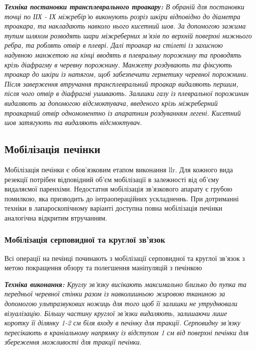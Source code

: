 \begin{refsection}
\textit{ \textbf{Техніка постановки трансплеврального троакару:} В обраній для постановки точці по ІІХ - ІХ  міжребір'ю виконують розріз шкіри відповідно до діаметра троакара, та накладають навколо нього кисетний шов. За допомогою зажима тупим шляхом розводять шари міжреберних м'язів по верхній поверхні нижнього ребра, та роблять отвір в плеврі. Далі троакар на стілеті із захисною надувною манжетою на кінці вводять в плевральну порожнину та проводять крізь діафрагму в черевну порожнину. Манжету роздувають та фіксують троакар до шкіри із натягом, щоб забезпечити герметику черевної порожнини. Після заверження втручання трансплевральний троакар видаляють першим, після чого отвір в діафрагмі ушивають. Залишки газу із плевральної порожинин видаляють за допомогою відсмоктувача, введеного крізь міжреберний троакарний отвір одномоментно із апаратним роздуванням легені. Кисетний шов затягують та видаляють відсмоктувач. }

\subsection{Мобілізація печінки}

Мобілізація печінки є обов'язковим етапом виконання \acrshort{llr}. Для кожного вида резекції потрібен відповідний об'єм мобілізації в залежності від об'єму видаляємої паренхіми. Недостатня мобілізація зв'язкового апарату є грубою помилкою, яка призводить до інтраопераційних ускладненнь. При дотриманні техніки в лапароскопічному варіанті доступна повна мобілізація печінки аналогічна відкритим втручанням. 

\subsubsection{Мобілізація серповидної та круглої зв'язок}

Всі операції на печінці починають з мобілізації серповидної та круглої зв'язок з метою покращення обзору та полегшення маніпуляцій з печінкою 

\textit{ \textbf{Техніка виконання:} Круглу зв'язку висікають максимально близько до пупка та передньої черевної стінки разом із навколишньою жировою тканиною за допомогою ультразвукових ножиць для того щоб її залишки не утруднювали візуалізацію. Більшу частину круглої зв'язки видаляють, залишаючи лише коротку її ділянку 1-2 см біля входу в печінку для тракції.  Серповидну зв'язку пересікають в краніальному напрямку із відступом 1 см від поверхні печінки для збереження можливості для тракції печінки.}


\end{refsection}
